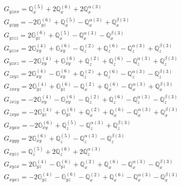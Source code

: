 \documentclass[fleqn,8pt,landscape]{jsarticle}
\begin{document}
\begin{align*}
& G_{yzxx} = \mathbb{Q}_{x}^{(5)} + 2 \mathbb{Q}_{x}^{(6)} + 2 \mathbb{Q}_{x}^{\alpha(3)} \\
& G_{yzyy} = - 2 \mathbb{G}_{yz}^{(6)} + \mathbb{Q}_{x}^{(5)} - \mathbb{Q}_{x}^{\alpha(3)} + \mathbb{Q}_{x}^{\beta(3)} \\
& G_{yzzz} = 2 \mathbb{G}_{yz}^{(6)} + \mathbb{Q}_{x}^{(5)} - \mathbb{Q}_{x}^{\alpha(3)} - \mathbb{Q}_{x}^{\beta(3)} \\
& G_{yzzx} = 2 \mathbb{G}_{xy}^{(4)} + \mathbb{G}_{xy}^{(6)} - \mathbb{Q}_{z}^{(2)} + \mathbb{Q}_{z}^{(6)} - \mathbb{Q}_{z}^{\alpha(3)} + \mathbb{Q}_{z}^{\beta(3)} \\
& G_{yzxz} = - 2 \mathbb{G}_{xy}^{(4)} + \mathbb{G}_{xy}^{(6)} + \mathbb{Q}_{z}^{(2)} + \mathbb{Q}_{z}^{(6)} - \mathbb{Q}_{z}^{\alpha(3)} + \mathbb{Q}_{z}^{\beta(3)} \\
& G_{zxyz} = 2 \mathbb{G}_{xy}^{(4)} - \mathbb{G}_{xy}^{(6)} + \mathbb{Q}_{z}^{(2)} + \mathbb{Q}_{z}^{(6)} - \mathbb{Q}_{z}^{\alpha(3)} - \mathbb{Q}_{z}^{\beta(3)} \\
& G_{zxxy} = 2 \mathbb{G}_{yz}^{(4)} + \mathbb{G}_{yz}^{(6)} - \mathbb{Q}_{x}^{(2)} + \mathbb{Q}_{x}^{(6)} - \mathbb{Q}_{x}^{\alpha(3)} + \mathbb{Q}_{x}^{\beta(3)} \\
& G_{zxzy} = - 2 \mathbb{G}_{xy}^{(4)} - \mathbb{G}_{xy}^{(6)} - \mathbb{Q}_{z}^{(2)} + \mathbb{Q}_{z}^{(6)} - \mathbb{Q}_{z}^{\alpha(3)} - \mathbb{Q}_{z}^{\beta(3)} \\
& G_{zxyx} = - 2 \mathbb{G}_{yz}^{(4)} + \mathbb{G}_{yz}^{(6)} + \mathbb{Q}_{x}^{(2)} + \mathbb{Q}_{x}^{(6)} - \mathbb{Q}_{x}^{\alpha(3)} + \mathbb{Q}_{x}^{\beta(3)} \\
& G_{xyxx} = - 2 \mathbb{G}_{xy}^{(6)} + \mathbb{Q}_{z}^{(5)} - \mathbb{Q}_{z}^{\alpha(3)} + \mathbb{Q}_{z}^{\beta(3)} \\
& G_{xyyy} = 2 \mathbb{G}_{xy}^{(6)} + \mathbb{Q}_{z}^{(5)} - \mathbb{Q}_{z}^{\alpha(3)} - \mathbb{Q}_{z}^{\beta(3)} \\
& G_{xyzz} = \mathbb{Q}_{z}^{(5)} + 2 \mathbb{Q}_{z}^{(6)} + 2 \mathbb{Q}_{z}^{\alpha(3)} \\
& G_{xyzx} = 2 \mathbb{G}_{yz}^{(4)} - \mathbb{G}_{yz}^{(6)} + \mathbb{Q}_{x}^{(2)} + \mathbb{Q}_{x}^{(6)} - \mathbb{Q}_{x}^{\alpha(3)} - \mathbb{Q}_{x}^{\beta(3)} \\
& G_{xyxz} = - 2 \mathbb{G}_{yz}^{(4)} - \mathbb{G}_{yz}^{(6)} - \mathbb{Q}_{x}^{(2)} + \mathbb{Q}_{x}^{(6)} - \mathbb{Q}_{x}^{\alpha(3)} - \mathbb{Q}_{x}^{\beta(3)}
\end{align*}
\end{document}
